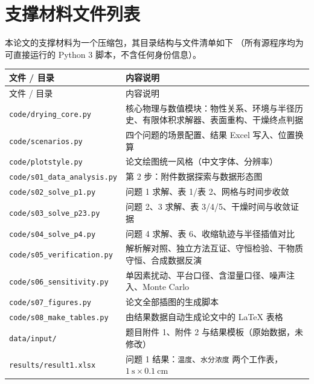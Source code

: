 \newpage
\appendix
\renewcommand{\thesection}{附录\Alph{section}}

\section{支撑材料文件列表}

本论文的支撑材料为一个压缩包，其目录结构与文件清单如下
（所有源程序均为可直接运行的 Python 3 脚本，不含任何身份信息）。

\begin{center}
\small
\begin{longtable}{@{}p{4.5cm}p{9.8cm}@{}}
\toprule
文件 / 目录 & 内容说明 \\
\midrule
\endfirsthead
\toprule
文件 / 目录 & 内容说明 \\
\midrule
\endhead
\texttt{code/drying\_core.py} & 核心物理与数值模块：物性关系、环境与半径历史、有限体积求解器、表面重构、干燥终点判据 \\
\texttt{code/scenarios.py} & 四个问题的场景配置、结果 Excel 写入、位置换算 \\
\texttt{code/plotstyle.py} & 论文绘图统一风格（中文字体、分辨率） \\
\texttt{code/s01\_data\_analysis.py} & 第 2 步：附件数据探索与数据形态图 \\
\texttt{code/s02\_solve\_p1.py} & 问题 1 求解、表 1/表 2、网格与时间步收敛 \\
\texttt{code/s03\_solve\_p23.py} & 问题 2、3 求解、表 3/4/5、干燥时间与收敛证据 \\
\texttt{code/s04\_solve\_p4.py} & 问题 4 求解、表 6、收缩轨迹与半径插值对比 \\
\texttt{code/s05\_verification.py} & 解析解对照、独立方法互证、守恒检验、干物质守恒、合成数据反演 \\
\texttt{code/s06\_sensitivity.py} & 单因素扰动、平台口径、含湿量口径、噪声注入、Monte Carlo \\
\texttt{code/s07\_figures.py} & 论文全部插图的生成脚本 \\
\texttt{code/s08\_make\_tables.py} & 由结果数据自动生成论文中的 LaTeX 表格 \\
\texttt{data/input/} & 题目附件 1、附件 2 与结果模板（原始数据，未修改） \\
\texttt{results/result1.xlsx} & 问题 1 结果：\texttt{温度}、\texttt{水分浓度} 两个工作表，$1\ \mathrm{s}\times0.1\ \mathrm{cm}$ \\

\end{longtable}
\end{center}
